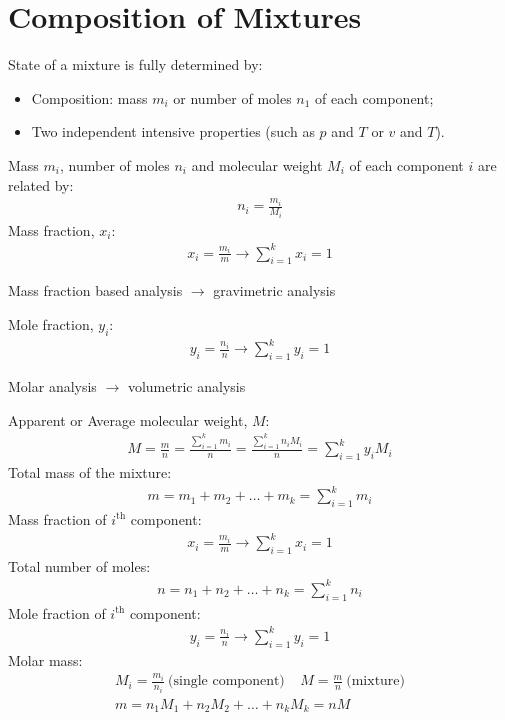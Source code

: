 \documentclass[class=report, crop=false, 12pt,a4paper]{standalone}
\begin{document}
\section{Composition of Mixtures}
State of a mixture is fully determined by:
\begin{itemize}
  \item Composition: mass $m_i$ or number of moles $n_1$ of each component;
  \item Two independent intensive properties (such as $p$ and $T$ or $v$ and $T$).  
\end{itemize}
Mass $m_i$, number of moles $n_i$ and molecular weight $M_i$ of each component $i$ are related by:
\begin{gather}
  n_i = \frac{m_i}{M_i}
\end{gather}
Mass fraction, $x_i$:
\begin{gather}
  x_i = \frac{m_i}{m} \longrightarrow \sum_{i=1}^{k}x_i = 1
\end{gather}
\begin{center}
  Mass fraction based analysis $\longrightarrow$ gravimetric analysis
\end{center}
Mole fraction, $y_i$:
\begin{gather}
  y_i = \frac{n_i}{n} \longrightarrow \sum_{i=1}^{k}y_i = 1
\end{gather}
\begin{center}
  Molar analysis $\longrightarrow$ volumetric analysis
\end{center}
Apparent or Average molecular weight, $M$:
\begin{gather}
  M = \frac{m}{n} = \frac{\sum_{i=1}^{k}m_i}{n} = \frac{\sum_{i=1}^{k}n_i M_i}{n} = \sum_{i=1}^{k}y_i M_i
\end{gather}
Total mass of the mixture: 
\begin{gather}
  m = m_1 + m_2 + \dots + m_k = \sum_{i=1}^{k}m_i
\end{gather}
Mass fraction of $i^{\text{th}}$ component:
\begin{gather}
  x_i = \frac{m_i}{m} \longrightarrow \sum_{i=1}^{k}x_i = 1
\end{gather}
Total number of moles:
\begin{gather}
  n = n_1 + n_2 + \dots + n_k = \sum_{i=1}^{k}n_i
\end{gather}
Mole fraction of $i^{\text{th}}$ component:
\begin{gather}
  y_i = \frac{n_i}{n} \longrightarrow \sum_{i=1}^{k}y_i = 1
\end{gather}
Molar mass: 
\begin{gather}
  M_i = \frac{m_i}{n_i} \ \text{(single component)} \ \ \ \ \ M = \frac{m}{n} \ \text{(mixture)} \\[5pt]
  m = n_1M_1 + n_2M_2 + \dots + n_kM_k = nM
\end{gather}
\end{document}

